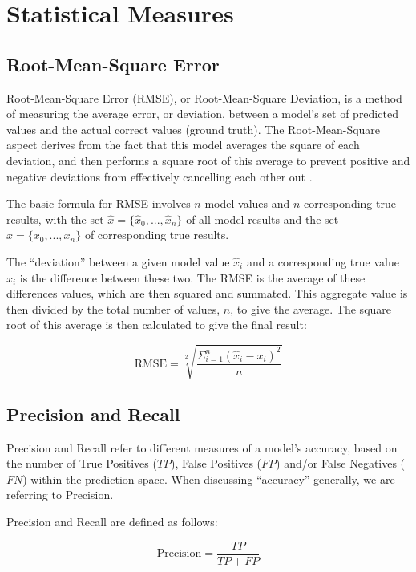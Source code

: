 \chapter{Statistical Measures}

\section{Root-Mean-Square Error}
\label{sec:rmse}
Root-Mean-Square Error (RMSE), or Root-Mean-Square Deviation, is a method of measuring the average error, or deviation, between a model's set of predicted values and the actual correct values (ground truth). The Root-Mean-Square aspect derives from the fact that this model averages the square of each deviation, and then performs a square root of this average to prevent positive and negative deviations from effectively cancelling each other out \cite{willmott2005advantages}.

The basic formula for RMSE involves $n$ model values and $n$ corresponding true results, with the set $\hat{x} = \{\hat{x}_0, ..., \hat{x}_n\}$ of all model results and the set $x = \{x_0, ..., x_n\}$ of corresponding true results.

The ``deviation'' between a given model value $\hat{x}_i$ and a corresponding true value $x_i$ is the difference between these two. The RMSE is the average of these differences values, which are then squared and summated. This aggregate value is then divided by the total number of values, $n$, to give the average. The square root of this average is then calculated to give the final result:

\begin{equation}
\textrm{RMSE} = \sqrt[2]{ \frac{\Sigma_{i=1}^n (\hat{x}_i - x_i)^2}{n} }
\end{equation}

\section{Precision and Recall}
\label{sec:precision}
Precision and Recall refer to different measures of a model's accuracy, based on the number of True Positives ($TP$), False Positives ($FP$) and/or False Negatives ($FN$) within the prediction space. When discussing ``accuracy'' generally, we are referring to Precision.

Precision and Recall are defined as follows:

\begin{equation}
\textrm{Precision} = \frac{TP}{TP + FP}
\end{equation}


